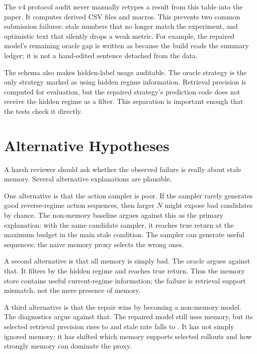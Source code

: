 \documentclass{article}
\begin{document}
The v4 protocol audit never manually retypes a result from this table into the paper.
It computes derived CSV files and macros. This prevents two common submission
failures: stale numbers that no longer match the experiment, and optimistic
text that silently drops a weak metric. For example, the repaired model's
remaining oracle gap is written as \EvidenceOracleGap{} because the build reads
the summary ledger; it is not a hand-edited sentence detached from the data.

The schema also makes hidden-label usage auditable. The oracle strategy is the
only strategy marked as using hidden regime information. Retrieval precision is
computed for evaluation, but the repaired strategy's prediction code does not
receive the hidden regime as a filter. This separation is important enough that
the tests check it directly.

\section{Alternative Hypotheses}
\label{app:alternative-hypotheses}

A harsh reviewer should ask whether the observed failure is really about stale
memory. Several alternative explanations are plausible.

One alternative is that the action sampler is poor. If the sampler rarely
generates good reverse-regime action sequences, then larger $N$ might expose
bad candidates by chance. The non-memory baseline argues against this as the
primary explanation: with the same candidate sampler, it reaches
\EvidenceBaseMaxTrue{} true return at the maximum budget in the main stale
condition. The sampler can generate useful sequences; the naive memory proxy
selects the wrong ones.

A second alternative is that all memory is simply bad. The oracle argues
against that. It filters by the hidden regime and reaches
\EvidenceOracleMaxTrue{} true return. Thus the memory store contains useful
current-regime information; the failure is retrieval support mismatch, not the
mere presence of memory.

A third alternative is that the repair wins by becoming a non-memory model.
The diagnostics argue against that. The repaired model still uses memory, but
its selected retrieval precision rises to \EvidenceRepairedPrecision{} and stale
rate falls to \EvidenceRepairedStaleRate{}. It has not simply ignored memory; it
has shifted which memory supports selected rollouts and how strongly memory
can dominate the proxy.
\end{document}
